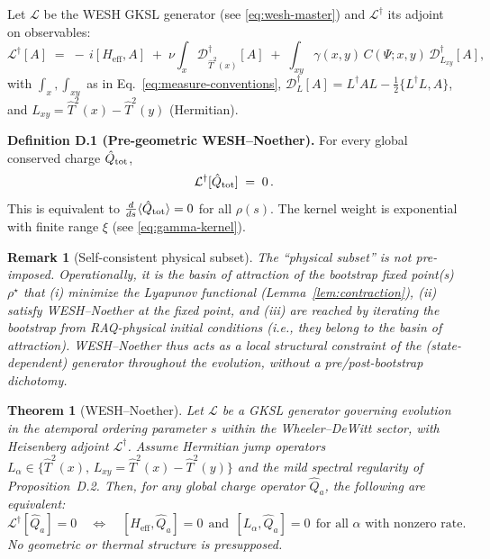 \documentclass[12pt,a4paper]{article}
\newtheorem{remark}{Remark}[section]
\newtheorem{theorem}{Theorem}[section]
\numberwithin{equation}{section}
\begin{document}
\noindent Let $\mathcal L$ be the WESH GKSL generator (see \eqref{eq:wesh-master}) and $\mathcal L^\dagger$ its adjoint on observables:
\[
\mathcal L^\dagger[A] \;=\; -\,i[H_{\mathrm{eff}},A] \;+\; \nu\!\int_x\!\mathcal D^\dagger_{\hat T^2(x)}[A] \;+\; \int_{xy}\gamma(x,y)\,C(\Psi;x,y)\,\mathcal D^\dagger_{L_{xy}}[A],
\]
with $\int_x,\int_{xy}$ as in Eq.~\eqref{eq:measure-conventions}, $\mathcal D^\dagger_{L}[A]= L^\dagger A L - \tfrac12\{L^\dagger L, A\}$, and $L_{xy}=\hat T^2(x)-\hat T^2(y)$ (Hermitian).

\vspace{0.5cm}
\noindent\textbf{Definition D.1 (Pre-geometric WESH--Noether).}
For every global conserved charge $\hat Q_{\rm tot}$,
\begin{equation}
\mathcal L^\dagger[\hat Q_{\rm tot}] \;=\; 0 \,.
\label{eq:H-noether}
\end{equation}
This is equivalent to $\tfrac{d}{ds}\langle \hat Q_{\rm tot}\rangle=0$ for all $\rho(s)$. The kernel weight is exponential with finite range $\xi$ (see \eqref{eq:gamma-kernel}).

\begin{remark}[Self-consistent physical subset]
The “physical subset” is \emph{not} pre-imposed. Operationally, it is the basin of attraction of the bootstrap fixed point(s) $\rho^\star$ that (i) minimize the Lyapunov functional (Lemma~\ref{lem:contraction}), (ii) satisfy WESH--Noether at the fixed point, and (iii) are reached by iterating the bootstrap from RAQ-physical initial conditions (i.e., they belong to the basin of attraction).
WESH--Noether thus acts as a \emph{local structural constraint} of the (state-dependent) generator throughout the evolution, without a pre/post-bootstrap dichotomy.
\end{remark}

\begin{theorem}[WESH--Noether]\label{thm:wesh-noether-pregeom}Let $\mathcal L$ be a GKSL generator governing evolution in the atemporal ordering parameter $s$ within the Wheeler--DeWitt sector, with Heisenberg adjoint $\mathcal L^\dagger$. Assume Hermitian jump operators $L_\alpha \in \{\hat T^2(x),\,L_{xy}=\hat T^2(x)-\hat T^2(y)\}$ and the mild spectral regularity of Proposition~D.2. Then, for any global charge operator $\hat Q_a$, the following are equivalent:
\begin{equation*}
\mathcal L^\dagger[\hat Q_a]=0 
\quad\Longleftrightarrow\quad
[H_{\mathrm{eff}},\hat Q_a]=0\ \ \text{and}\ \ [L_\alpha,\hat Q_a]=0\ \ \text{for all }\alpha\text{ with nonzero rate}.
\end{equation*}
No geometric or thermal structure is presupposed.
\end{theorem}
\end{document}
